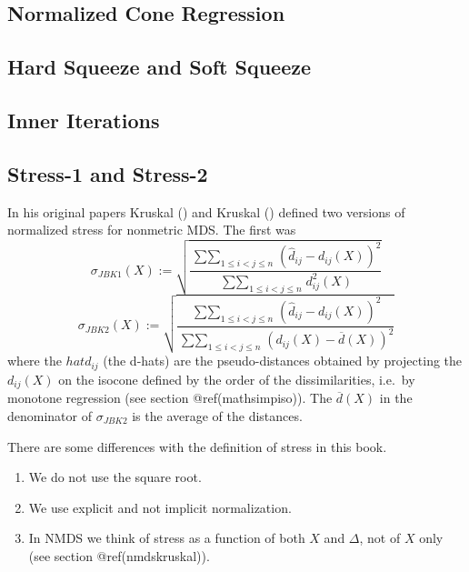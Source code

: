 \documentclass[
  12pt,
  letterpaper,
  DIV=11,
  numbers=noendperiod]{scrreprt}
\providecommand{\tightlist}{%
  \setlength{\itemsep}{0pt}\setlength{\parskip}{0pt}}\usepackage{longtable,booktabs,array}
\theoremstyle{remark}
\begin{document}
\subsection{Normalized Cone
Regression}\label{normalized-cone-regression}

\subsection{Hard Squeeze and Soft
Squeeze}\label{hard-squeeze-and-soft-squeeze}

\subsection{Inner Iterations}\label{inner-iterations}

\subsection{Stress-1 and Stress-2}\label{stress-1-and-stress-2}

In his original papers Kruskal () and
Kruskal () defined two versions of
normalized stress for nonmetric MDS. The first was \[
\sigma_{JBK1}(X):=\sqrt{\frac{\mathop{\sum\sum}_{1\leq i<j\leq n}(\hat d_{ij}-d_{ij}(X))^2}{\mathop{\sum\sum}_{1\leq i<j\leq n}d_{ij}^2(X)}}
\] \[
\sigma_{JBK2}(X):=\sqrt{\frac{\mathop{\sum\sum}_{1\leq i<j\leq n}(\hat d_{ij}-d_{ij}(X))^2}{\mathop{\sum\sum}_{1\leq i<j\leq n}(d_{ij}(X)-\overline{d}(X))^2}}
\] where the \(hat d_{ij}\) (the d-hats) are the pseudo-distances
obtained by projecting the \(d_{ij}(X)\) on the isocone defined by the
order of the dissimilarities, i.e.~by monotone regression (see section
@ref(mathsimpiso)). The \(\overline{d}(X)\) in the denominator of
\(\sigma_{JBK2}\) is the average of the distances.

There are some differences with the definition of stress in this book.

\begin{enumerate}
\def\labelenumi{\arabic{enumi}.}
\tightlist
\item
  We do not use the square root.
\item
  We use explicit and not implicit normalization.
\item
  In NMDS we think of stress as a function of both \(X\) and \(\Delta\),
  not of \(X\) only (see section @ref(nmdskruskal)).
\end{enumerate}

\end{document}
